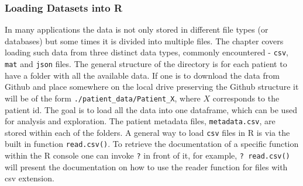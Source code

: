 \subsubsection{Loading Datasets into R}
In many applications the data is not only stored in different file types (or databases) but some times it is divided into multiple files. The chapter covers loading such data from three distinct data types, commonly encountered - \verb|csv|, \verb|mat| and \verb|json| files. The general structure of the directory is for each patient to have a folder with all the available data. If one is to download the data from Github and place somewhere on the local drive preserving the Github structure it will be of the form \verb|./patient_data/Patient_X|, where $X$ corresponds to the patient id. The goal is to load all the data into one dataframe, which can be used for analysis and exploration.
The patient metadata files, \verb|metadata.csv|, are stored within each of the folders. A general way to load \verb|csv| files in R is via the built in function \verb|read.csv()|. To retrieve the documentation of a specific function within the R console one can invoke \verb|?| in front of it, for example, \verb|? read.csv()| will present the documentation on how to use the reader function for files with csv extension.

